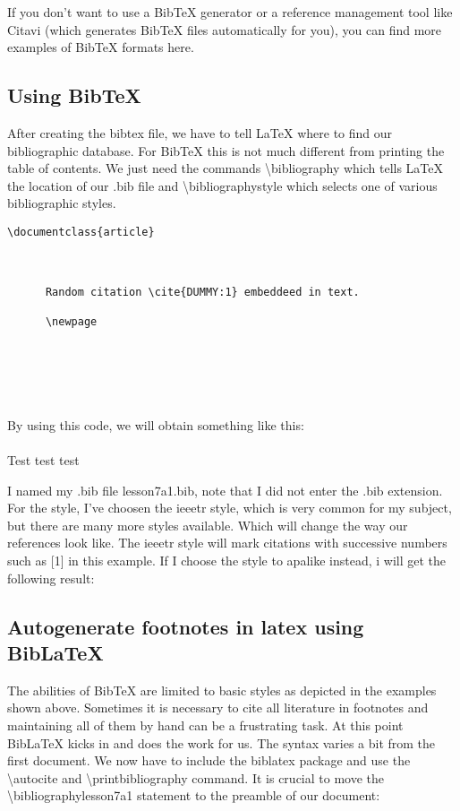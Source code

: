     If you don't want to use a BibTeX generator or a reference management tool like Citavi (which generates BibTeX files automatically for you), you can find more examples of BibTeX formats here.
  \subsection{Using BibTeX}
    After creating the bibtex file, we have to tell LaTeX where to find our bibliographic database. For BibTeX this is not much different from printing the table of contents. We just need the commands \textbackslash bibliography which tells LaTeX the location of our .bib file and \textbackslash bibliographystyle which selects one of various bibliographic styles.
    
    \begin{lstlisting}[language={[LaTeX]TeX}, breaklines=true,frame=single]
      \documentclass{article}

      
      
      Random citation \cite{DUMMY:1} embeddeed in text.
      
      \newpage
      
       
      
      
      
    \end{lstlisting}

    By using this code, we will obtain something like this:
    \paragraph{}
    Test test test \cite{Lee2009a}
    \printbibliography

    I named my .bib file lesson7a1.bib, note that I did not enter the .bib extension. For the style, I've choosen the ieeetr style, which is very common for my subject, but there are many more styles available. Which will change the way our references look like. The ieeetr style will mark citations with successive numbers such as [1] in this example. If I choose the style to apalike instead, i will get the following result:
    
    
    \subsection{Autogenerate footnotes in latex using BibLaTeX}
      The abilities of BibTeX are limited to basic styles 
      as depicted in the examples shown above. Sometimes 
      it is necessary to cite all literature in footnotes
       and maintaining all of them by hand can be a frustrating 
       task. At this point BibLaTeX kicks in and does the work 
       for us. The syntax varies a bit from the first document. 
       We now have to include the biblatex package and use the 
       \textbackslash autocite and \textbackslash printbibliography
        command. It is crucial to move the \textbackslash bibliography{lesson7a1}
         statement to the preamble of our document:
    

